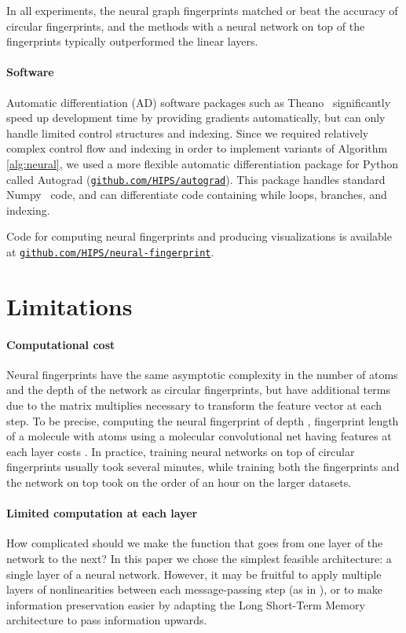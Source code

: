 \documentclass{article}
\newcommand{\citep}{\cite}
\begin{document}
In all experiments, the neural graph fingerprints matched or beat the accuracy of circular fingerprints, and the methods with a neural network on top of the fingerprints typically outperformed the linear layers.

\paragraph{Software}
Automatic differentiation (AD) software packages such as Theano~\citep{Bastien-Theano-2012} significantly speed up development time by providing gradients automatically, but can only handle limited control structures and indexing.
Since we required relatively complex control flow and indexing in order to implement variants of Algorithm \ref{alg:neural}, we used a more flexible automatic differentiation package for Python called Autograd (\href{http://github.com/HIPS/autograd}{\texttt{github.com/HIPS/autograd}}).
This package handles standard Numpy~\citep{oliphant2007python} code, and can differentiate code containing while loops, branches, and indexing.

Code for computing neural fingerprints and producing visualizations is available at \href{http://github.com/HIPS/neural-fingerprint}{\texttt{github.com/HIPS/neural-fingerprint}}.

\section{Limitations}


\paragraph{Computational cost}
Neural fingerprints have the same asymptotic complexity in the number of atoms and the depth of the network as circular fingerprints, but have additional terms due to the matrix multiplies necessary to transform the feature vector at each step.
To be precise, computing the neural fingerprint of depth , fingerprint length  of a molecule with  atoms using a molecular convolutional net having  features at each layer costs .
In practice, training neural networks on top of circular fingerprints usually took several minutes, while training both the fingerprints and the network on top took on the order of an hour on the larger datasets.

\paragraph{Limited computation at each layer}
How complicated should we make the function that goes from one layer of the network to the next?
In this paper we chose the simplest feasible architecture: a single layer of a neural network.
However, it may be fruitful to apply multiple layers of nonlinearities between each message-passing step (as in \cite{graphnn2009}), or to make information preservation easier by adapting the Long Short-Term Memory~\citep{hochreiter1997long} architecture to pass information upwards.
\end{document}
